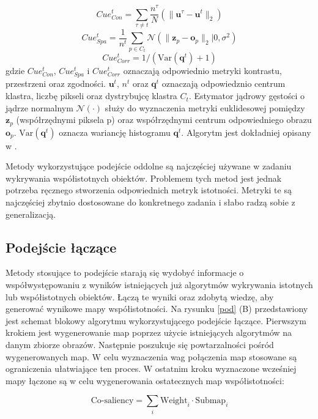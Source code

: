 \documentclass[a4paper,12pt,twoside,openany]{report}
\begin{document}
	\begin{equation}
		Cue^t_{Con} = \sum_{\tau \neq t} \frac{n^\tau}{N}\left(\|\mathbf{u}^\tau - \mathbf{u}^t\|_2\right)
	\end{equation}
	\begin{equation}
		Cue^t_{Spa} = \frac{1}{n^t}\sum_{p \in C_t} \mathcal{N}\left(\|\mathbf{z}_p - \mathbf{o}_p\|_2|0,\sigma^2\right)
	\end{equation}
	\begin{equation}
		Cue^t_{Corr} = 1/\left(\text{Var}\left(\mathbf{q}^t\right)+1\right)
	\end{equation}
	gdzie $Cue^t_{Con}$, $Cue^t_{Spa}$ i $Cue^t_{Corr}$ oznaczają odpowiednio metryki kontrastu, przestrzeni oraz zgodności. $\mathbf{u}^t$, $n^t$ oraz $\mathbf{q}^t$ oznaczają odpowiedznio centrum klastra, liczbę pikseli oraz dystrybujcę klastra $C_t$. Estymator jądrowy gęstości o jądrze normalnym $\mathcal{N}(\cdot)$ służy do wyznaczenia metryki euklidesowej pomiędzy $\mathbf{z}_p$ (współrzędnymi piksela p) oraz współrzędnymi centrum odpowiedniego obrazu $\mathbf{o}_p$. $\text{Var}\left(\mathbf{q}^t\right)$ oznacza wariancję histogramu $\mathbf{q}^t$. Algorytm jest dokładniej opisany w \cite{bott}.

	Metody wykorzystujące podejście oddolne są najczęściej używane w zadaniu wykrywania współistotnych obiektów. Problemem tych metod jest jednak potrzeba ręcznego stworzenia odpowiednich metryk istotności. Metryki te są najczęściej zbytnio dostosowane do konkretnego zadania i słabo radzą sobie z generalizacją.

	\subsection{Podejście łączące}
	Metody stosujące to podejście starają się wydobyć informacje o współwystępowaniu z wyników istniejących już algorytmów wykrywania istotnych lub współistotnych obiektów. Łączą te wyniki oraz zdobytą wiedzę, aby generować wynikowe mapy współistotności. Na rysunku \ref{pod} (B) przedstawiony jest schemat blokowy algorytmu wykorzystującego podejście łączące. Pierwszym krokiem jest wygenerowanie map poprzez użycie istniejących algorytmów na danym zbiorze obrazów. Następnie poszukuje się powtarzalności pośród wygenerowanych map. W celu wyznaczenia wag połączenia map stosowane są ograniczenia ułatwiające ten proces. W ostatnim kroku wyznaczone wcześniej mapy łączone są w celu wygenerowania ostatecznych map współistotności:

	$$
	\text{Co-saliency} = \sum_i \text{Weight}_i \cdot \text{Submap}_i
	$$
\end{document}
